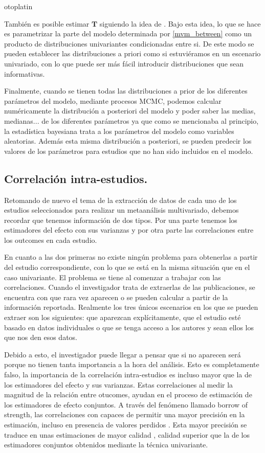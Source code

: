 otoplatin\documentclass[a4paper,openright,12pt]{report}
\begin{document}
También es posible estimar $\mathbf{T}$ siguiendo la idea de \cite{Bujkiewicz2013}. Bajo esta idea, lo que se hace es parametrizar la parte del modelo determinada por \ref{mvm_between} como un producto de distribuciones univariantes condicionadas entre si. De este modo se pueden establecer las distribuciones a priori como si estuviéramos en un escenario univariado, con lo que puede ser más fácil introducir distribuciones que sean informativas.

Finalmente, cuando se tienen todas las distribuciones a prior de los diferentes parámetros del modelo, mediante procesos MCMC, podemos calcular numéricamente la distribución a posteriori del modelo y poder saber las medias, medianas... de los diferentes parámetros ya que como se mencionaba al principio, la estadística bayesiana trata a los parámetros del modelo como variables aleatorias. Además esta misma distribución a posteriori, se pueden predecir los valores de los parámetros para estudios que no han sido incluidos en el modelo.
\newpage

\subsection{Correlación intra-estudios.}

Retomando de nuevo el tema de la extracción de datos de cada uno de los estudios seleccionados para realizar un metaanálisis multivariado, debemos recordar que tenemos información de dos tipos. Por una parte tenemos los estimadores del efecto con sus varianzas y por otra parte las correlaciones entre los outcomes en cada estudio.

En cuanto a las dos primeras no existe ningún problema para obtenerlas a partir del estudio correspondiente, con lo que se está en la misma situación que en el caso univariante. El problema se tiene al comenzar a trabajar con las correlaciones. Cuando el investigador trata de extraerlas de las publicaciones, se encuentra con que rara vez aparecen o se pueden calcular a partir de la información reportada. Realmente los tres únicos escenarios en los que se pueden extraer son los siguientes: que aparezcan explícitamente, que el estudio esté basado en datos individuales o que se tenga acceso a los autores y sean ellos los que nos den esos datos.

Debido a esto, el investigador puede llegar a pensar que si no aparecen será porque no tienen tanta importancia a la hora del análisis. Esto es completamente falso, la importancia de la correlación intra-estudios es incluso mayor que la de los estimadores del efecto y sus varianzas. Estas correlaciones al medir la magnitud de la relación entre otucomes, ayudan en el proceso de estimación de los estimadores de efecto conjuntos. A través del fenómeno llamado borrow of strength, las correlaciones con capaces de permitir una mayor precisión en la estimación, incluso en presencia de valores perdidos \cite{Higgins1996}. Esta mayor precisión se traduce en unas estimaciones de mayor calidad \cite{Nam2003}\cite{Mavridis2011}\cite{Riley2007}\cite{Jackson2011}, calidad superior que la de los estimadores conjuntos obtenidos mediante la técnica univariante.
\end{document}
